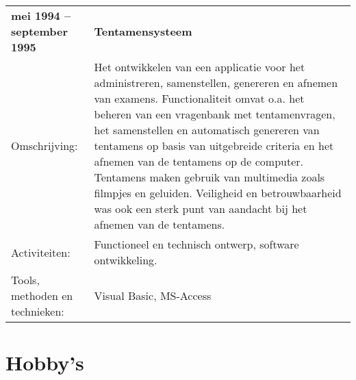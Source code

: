 \documentclass[a4paper]{article}
\newcommand{\omschrijving}{Omschrijving:}
\newcommand{\activiteiten}{Activiteiten:}
\newcommand{\tools}{Tools, methoden en technieken:}
\newcommand{\tabelh}[1]{\textbf{#1}}
\begin{document}
        \medskip
        
        \begin{tabular}{l p{10cm}}
            \tabelh{mei 1994 -- september 1995} & \tabelh{Tentamensysteem} \\
            \omschrijving &
            Het ontwikkelen van een applicatie voor het administreren,
            samenstellen, genereren en afnemen van examens.  Functionaliteit
            omvat o.a. het beheren van een vragenbank met tentamenvragen,
            het samenstellen en automatisch genereren van tentamens op basis
            van uitgebreide criteria en het afnemen van de tentamens op de
            computer. Tentamens maken gebruik van multimedia zoals filmpjes
            en geluiden. Veiligheid en betrouwbaarheid was ook een sterk punt
            van aandacht bij het afnemen van de tentamens. \\
            \activiteiten &
            Functioneel en technisch ontwerp, software ontwikkeling. \\
            \tools &
            Visual Basic, MS-Access \\
        \end{tabular}
           
        \medskip
        
	\section*{Hobby's}
     \\
	 \\
	 \\
\end{document}
